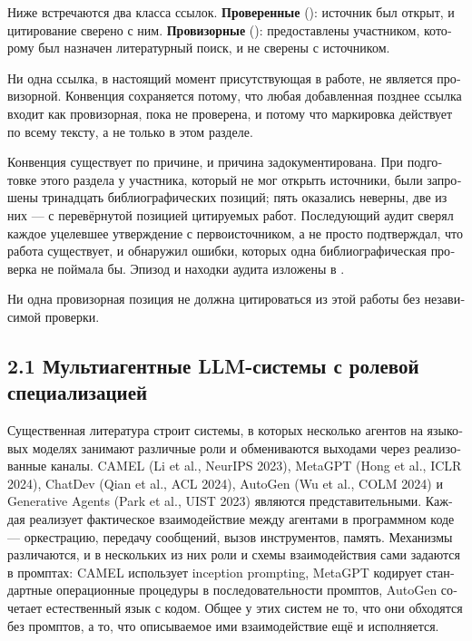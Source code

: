 \begin{russian}
Ниже встречаются два класса ссылок. \textbf{Проверенные} (\gcheck{}): источник был открыт, и цитирование сверено с ним. \textbf{Провизорные} (\gwarn{}): предоставлены участником, которому был назначен литературный поиск, и не сверены с источником.

Ни одна ссылка, в настоящий момент присутствующая в работе, не является провизорной. Конвенция сохраняется потому, что любая добавленная позднее ссылка входит как провизорная, пока не проверена, и потому что маркировка действует по всему тексту, а не только в этом разделе.

Конвенция существует по причине, и причина задокументирована. При подготовке этого раздела у участника, который не мог открыть источники, были запрошены тринадцать библиографических позиций; пять оказались неверны, две из них — с перевёрнутой позицией цитируемых работ. Последующий аудит сверял каждое уцелевшее утверждение с первоисточником, а не просто подтверждал, что работа существует, и обнаружил ошибки, которых одна библиографическая проверка не поймала бы. Эпизод и находки аудита изложены в .

Ни одна провизорная позиция не должна цитироваться из этой работы без независимой проверки.


\subsection*{2.1 Мультиагентные LLM-системы с ролевой специализацией}
\label{sec:ru:2.1}

Существенная литература строит системы, в которых несколько агентов на языковых моделях занимают различные роли и обмениваются выходами через реализованные каналы. \gcheck{} CAMEL (Li et al., NeurIPS 2023), MetaGPT (Hong et al., ICLR 2024), ChatDev (Qian et al., ACL 2024), AutoGen (Wu et al., COLM 2024) и Generative Agents (Park et al., UIST 2023) являются представительными. Каждая реализует фактическое взаимодействие между агентами в программном коде — оркестрацию, передачу сообщений, вызов инструментов, память. Механизмы различаются, и в нескольких из них роли и схемы взаимодействия сами задаются в промптах: CAMEL использует inception prompting, MetaGPT кодирует стандартные операционные процедуры в последовательности промптов, AutoGen сочетает естественный язык с кодом. Общее у этих систем не то, что они обходятся без промптов, а то, что описываемое ими взаимодействие ещё и исполняется.


\end{russian}
